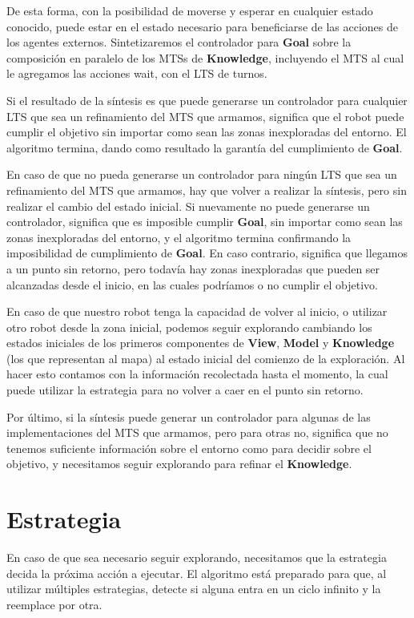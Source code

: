 De esta forma, con la posibilidad de moverse y esperar en cualquier estado conocido, puede estar en el estado necesario para beneficiarse de las acciones de 
los agentes externos. Sintetizaremos el controlador para \textbf{Goal} sobre la composición en paralelo de los MTSs de \textbf{Knowledge}, incluyendo el MTS al 
cual le agregamos las acciones wait, con el LTS de turnos.

Si el resultado de la síntesis es que puede generarse un controlador para cualquier LTS que sea un refinamiento del MTS que armamos, significa que el robot 
puede cumplir el objetivo sin importar como sean las zonas inexploradas del entorno. El algoritmo termina, dando como resultado la garantía del cumplimiento 
de \textbf{Goal}.

En caso de que no pueda generarse un controlador para ningún LTS que sea un refinamiento del MTS que armamos, hay que volver a realizar la síntesis, pero sin 
realizar el cambio del estado inicial. Si nuevamente no puede generarse un controlador, significa que es imposible cumplir \textbf{Goal}, sin importar como sean 
las zonas inexploradas del entorno, y el algoritmo termina confirmando la imposibilidad de cumplimiento de \textbf{Goal}. En caso contrario, significa que 
llegamos a un punto sin retorno, pero todavía hay zonas inexploradas que pueden ser alcanzadas desde el inicio, en las cuales podríamos o no cumplir el objetivo. 

En caso de que nuestro robot tenga la capacidad de volver al inicio, o utilizar otro robot desde la zona inicial, podemos seguir explorando cambiando los 
estados iniciales de los primeros componentes de \textbf{View}, \textbf{Model} y \textbf{Knowledge} (los que representan al mapa) al estado inicial del comienzo 
de la exploración. Al hacer esto contamos con la información recolectada hasta el momento, la cual puede utilizar la estrategia para no volver a caer en el 
punto sin retorno.

Por último, si la síntesis puede generar un controlador para algunas de las implementaciones del MTS que armamos, pero para otras no, significa que no tenemos 
suficiente información sobre el entorno como para decidir sobre el objetivo, y necesitamos seguir explorando para refinar el \textbf{Knowledge}.

\section{Estrategia}

En caso de que sea necesario seguir explorando, necesitamos que la estrategia decida la próxima acción a ejecutar. El algoritmo está preparado para que, 
al utilizar múltiples estrategias, detecte si alguna entra en un ciclo infinito y la reemplace por otra.

